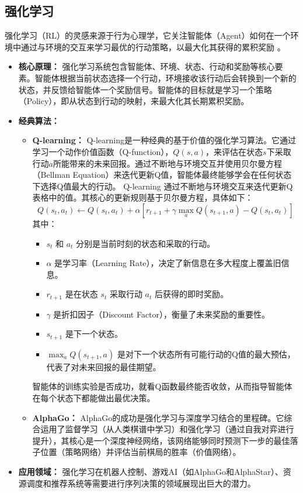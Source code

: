\subsection{强化学习}
\label{ssec:reinforcement_learning}
强化学习（RL）的灵感来源于行为心理学，它关注智能体（Agent）如何在一个环境中通过与环境的交互来学习最优的行动策略，以最大化其获得的累积奖励 \cite{matsuo2022deep}。
\begin{itemize}
    \item \textbf{核心原理：} 强化学习系统包含智能体、环境、状态、行动和奖励等核心要素。智能体根据当前状态选择一个行动，环境接收该行动后会转换到一个新的状态，并反馈给智能体一个奖励信号。智能体的目标就是学习一个策略（Policy），即从状态到行动的映射，来最大化其长期累积奖励。
    \item \textbf{经典算法：}
        \begin{itemize}
            \item \textbf{Q-learning：} Q-learning是一种经典的基于价值的强化学习算法。它通过学习一个动作价值函数（Q-function），$Q(s, a)$，来评估在状态$s$下采取行动$a$所能带来的未来回报。通过不断地与环境交互并使用贝尔曼方程（Bellman Equation）来迭代更新Q值，智能体最终能够学会在任何状态下选择Q值最大的行动。
            Q-learning 通过不断地与环境交互来迭代更新Q表格中的值。其核心的更新规则基于贝尔曼方程，具体如下：
			\[
				Q(s_t, a_t) \leftarrow Q(s_t, a_t) + \alpha \left[ r_{t+1} + \gamma \max_{a} Q(s_{t+1}, a) - Q(s_t, a_t) \right]
			\]
			其中：
			\begin{itemize}
				\item $s_t$ 和 $a_t$ 分别是当前时刻的状态和采取的行动。
				\item $\alpha$ 是学习率（Learning Rate），决定了新信息在多大程度上覆盖旧信息。
				\item $r_{t+1}$ 是在状态 $s_t$ 采取行动 $a_t$ 后获得的即时奖励。
				\item $\gamma$ 是折扣因子（Discount Factor），衡量了未来奖励的重要性。
				\item $s_{t+1}$ 是下一个状态。
				\item $\max_{a} Q(s_{t+1}, a)$ 是对下一个状态所有可能行动的Q值的最大预估，代表了对未来回报的最佳期望。
			\end{itemize}
			智能体的训练实验是否成功，就看Q函数最终能否收敛，从而指导智能体在每个状态下都能做出最优决策。
            \item \textbf{AlphaGo：} AlphaGo的成功是强化学习与深度学习结合的里程碑。它综合运用了监督学习（从人类棋谱中学习）和强化学习（通过自我对弈进行提升），其核心是一个深度神经网络，该网络能够同时预测下一步的最佳落子位置（策略网络）并评估当前棋局的胜率（价值网络）。
        \end{itemize}
    \item \textbf{应用领域：} 强化学习在机器人控制、游戏AI（如AlphaGo和AlphaStar）、资源调度和推荐系统等需要进行序列决策的领域展现出巨大的潜力。
\end{itemize}

